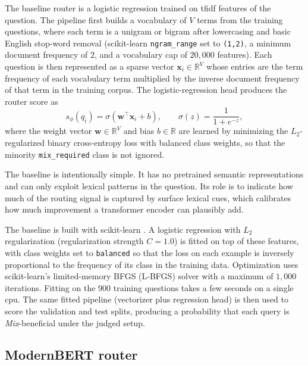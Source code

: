 \documentclass[english, bibtex]{kththesis}               %
\numberwithin{listing}{chapter}
\begin{document}
The baseline router is a logistic regression trained on \gls{tfidf} features of the question. The pipeline first builds a vocabulary of \(V\) terms from the training questions, where each term is a unigram or bigram after lowercasing and basic English stop-word removal (scikit-learn \texttt{ngram\_range} set to \texttt{(1,2)}, a minimum document frequency of $2$, and a vocabulary cap of $20{,}000$ features). Each question is then represented as a sparse vector \(\mathbf{x}_i \in \mathbb{R}^{V}\) whose entries are the term frequency of each vocabulary term multiplied by the inverse document frequency of that term in the training corpus. The logistic-regression head produces the router score as
\begin{equation}
\label{eq:tfidfScore}
s_\phi(q_i) = \sigma(\mathbf{w}^\top \mathbf{x}_i + b),
\qquad
\sigma(z) = \frac{1}{1 + e^{-z}},
\end{equation}
where the weight vector \(\mathbf{w} \in \mathbb{R}^{V}\) and bias \(b \in \mathbb{R}\) are learned by minimizing the $L_2$-regularized binary cross-entropy loss with balanced class weights, so that the minority \texttt{mix\_required} class is not ignored.

The baseline is intentionally simple. It has no pretrained semantic representations and can only exploit lexical patterns in the question. Its role is to indicate how much of the routing signal is captured by surface lexical cues, which calibrates how much improvement a transformer encoder can plausibly add.

The baseline is built with scikit-learn \cite{pedregosa2011scikit}. A logistic regression with $L_2$ regularization (regularization strength $C=1.0$) is fitted on top of these features, with class weights set to \texttt{balanced} so that the loss on each example is inversely proportional to the frequency of its class in the training data. Optimization uses scikit-learn's limited-memory BFGS (L-BFGS) solver \cite{liu1989limited} with a maximum of $1{,}000$ iterations. Fitting on the 900 training questions takes a few seconds on a single \gls{cpu}. The same fitted pipeline (vectorizer plus regression head) is then used to score the validation and test splits, producing a probability that each query is \emph{Mix}-beneficial under the judged setup.

\subsection{ModernBERT router}
\label{sec:methodModernBert}
\end{document}
